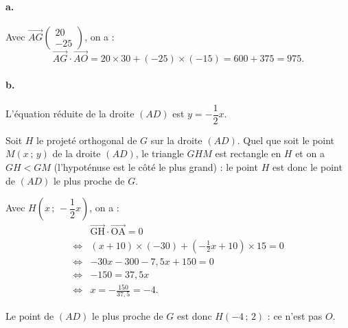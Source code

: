 \documentclass[10pt]{article}
\begin{document}
\paragraph{a.} Avec \(\overrightarrow{AG} \begin{pmatrix} 20 \\ -25 \end{pmatrix}\), on a :
\[
\overrightarrow{AG} \cdot \overrightarrow{AO} = 20 \times 30 + (-25) \times (-15) = 600 + 375 = 975.
\]

\paragraph{b.} L'équation réduite de la droite \((AD)\) est \( y = -\dfrac{1}{2}x \).

Soit \(H\) le projeté orthogonal de \(G\) sur la droite \((AD)\). Quel que soit le point \(M(x\,;\,y)\) de la droite \((AD)\), le triangle \(GHM\) est rectangle en \(H\) et on a \(GH < GM\) (l'hypoténuse est le côté le plus grand) : le point \(H\) est donc le point de \((AD)\) le plus proche de \(G\).

Avec \(H(x\,;\,-\dfrac{1}{2}x)\), on a :
\begin{align*}
&\overrightarrow{\text{GH}} \cdot \overrightarrow{\text{OA}} = 0 \\
\iff &(x + 10) \times (-30) + \left( -\frac{1}{2}x + 10 \right) \times 15 = 0 \\
\iff &-30x - 300 - 7{,}5x + 150 = 0 \\
\iff &-150 = 37{,}5x \\
\iff &x = -\frac{150}{37{,}5} = -4.
\end{align*}

Le point de \( (AD) \) le plus proche de \( G \) est donc \( H(-4 \,;\, 2) \) : ce n'est pas \( O \).
\end{document}
